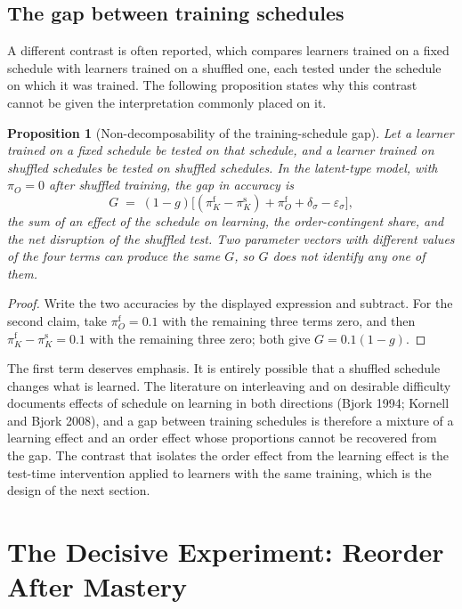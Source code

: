 \documentclass[11pt]{article}
\newtheorem{proposition}{Proposition}
\theoremstyle{remark}
\begin{document}
\subsection{The gap between training schedules}

A different contrast is often reported, which compares learners trained on a fixed schedule with learners trained on a shuffled one, each tested under the schedule on which it was trained. The following proposition states why this contrast cannot be given the interpretation commonly placed on it.

\begin{proposition}[Non-decomposability of the training-schedule gap]
Let a learner trained on a fixed schedule be tested on that schedule, and a learner trained on shuffled schedules be tested on shuffled schedules. In the latent-type model, with $\pi_O=0$ after shuffled training, the gap in accuracy is
\[
G \;=\; (1-g)\bigl[(\pi_K^{\mathrm f}-\pi_K^{\mathrm s}) + \pi_O^{\mathrm f} + \delta_\sigma - \varepsilon_\sigma\bigr],
\]
the sum of an effect of the schedule on learning, the order-contingent share, and the net disruption of the shuffled test. Two parameter vectors with different values of the four terms can produce the same $G$, so $G$ does not identify any one of them.
\end{proposition}

\begin{proof}
Write the two accuracies by the displayed expression and subtract. For the second claim, take $\pi_O^{\mathrm f}=0.1$ with the remaining three terms zero, and then $\pi_K^{\mathrm f}-\pi_K^{\mathrm s}=0.1$ with the remaining three zero; both give $G=0.1(1-g)$.
\end{proof}

The first term deserves emphasis. It is entirely possible that a shuffled schedule changes what is learned. The literature on interleaving and on desirable difficulty documents effects of schedule on learning in both directions (Bjork 1994; Kornell and Bjork 2008), and a gap between training schedules is therefore a mixture of a learning effect and an order effect whose proportions cannot be recovered from the gap. The contrast that isolates the order effect from the learning effect is the test-time intervention applied to learners with the same training, which is the design of the next section.

\section{The Decisive Experiment: Reorder After Mastery}
\end{document}
